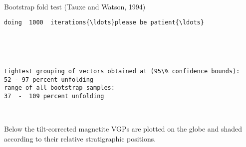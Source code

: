 \documentclass[11pt]{article}
\begin{document}
    \begin{center}
    \end{center}
    { \hspace*{\fill} \\}
    
    Bootstrap fold test (Tauxe and Watson, 1994)


    \begin{Verbatim}[commandchars=\\\{\}]
doing  1000  iterations{\ldots}please be patient{\ldots}
    \end{Verbatim}

    \begin{center}
    \end{center}
    { \hspace*{\fill} \\}
    
    \begin{center}
    \end{center}
    { \hspace*{\fill} \\}
    
    \begin{Verbatim}[commandchars=\\\{\}]
tightest grouping of vectors obtained at (95\% confidence bounds):
52 - 97 percent unfolding
range of all bootstrap samples: 
37  -  109 percent unfolding
    \end{Verbatim}

    \begin{center}
    \end{center}
    { \hspace*{\fill} \\}
    
    Below the tilt-corrected magnetite VGPs are plotted on the globe and
shaded according to their relative stratigraphic positions.


    \begin{center}
    \end{center}
    { \hspace*{\fill} \\}
    
\end{document}
